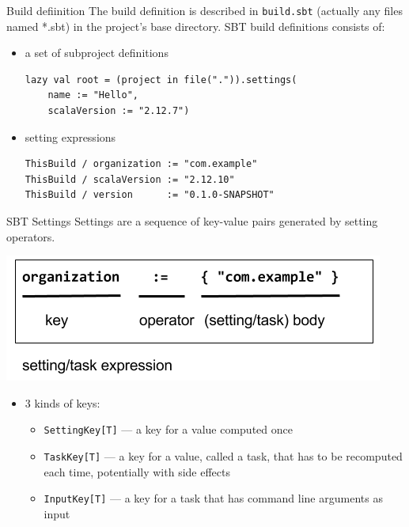 \documentclass[aspectratio=169]{beamer}
\begin{document}
\begin{frame}[fragile]{Build defiinition}
The build definition is described in \texttt{build.sbt} (actually any files named *.sbt) in the project’s
base directory. SBT build definitions consists of:

\begin{itemize}
  \item a set of subproject definitions \\
    \begin{verbatim}
lazy val root = (project in file(".")).settings(
    name := "Hello",
    scalaVersion := "2.12.7") 
    \end{verbatim}
  \item setting expressions \\
\begin{verbatim}
ThisBuild / organization := "com.example"
ThisBuild / scalaVersion := "2.12.10"
ThisBuild / version      := "0.1.0-SNAPSHOT"
\end{verbatim}
\end{itemize}
\end{frame}

\begin{frame}[fragile]{SBT Settings}
Settings are a sequence of key-value pairs generated by setting operators.
\begin{center}
  \includegraphics[scale=0.3]{setting-expression}
\end{center}
\begin{itemize}
  \item 3 kinds of keys:
    \begin{itemize}
      \item \texttt{SettingKey[T]} --- a key for a value computed once
      \item \texttt{TaskKey[T]} --- a key for a value, called a task, that has to be recomputed each
        time, potentially with side effects
      \item \texttt{InputKey[T]} --- a key for a task that has command line arguments as input
    \end{itemize}
\end{itemize}
\end{frame}
\end{document}
